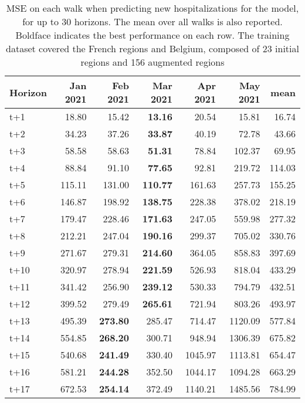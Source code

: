 \begin{table}[H]
\centering
\caption{MSE on each walk when predicting new hospitalizations for the model, for up to 30 horizons. The mean over all walks is also reported. Boldface indicates the best performance on each row. The training dataset covered the French regions and Belgium, composed of 23 initial regions and 156 augmented regions }
\label{tab:MSE_walk_dense_model}
\begin{tabular}{lrrrrrr}
\toprule
Horizon &  Jan 2021 &  Feb 2021 &  Mar 2021 &  Apr 2021 &  May 2021 &    mean \\
\midrule
t+1  & 18.80  & 15.42  & \textbf{13.16}  & 20.54  & 15.81  & 16.74  \\
t+2  & 34.23  & 37.26  & \textbf{33.87}  & 40.19  & 72.78  & 43.66  \\
t+3  & 58.58  & 58.63  & \textbf{51.31}  & 78.84  & 102.37  & 69.95  \\
t+4  & 88.84  & 91.10  & \textbf{77.65}  & 92.81  & 219.72  & 114.03  \\
t+5  & 115.11  & 131.00  & \textbf{110.77}  & 161.63  & 257.73  & 155.25  \\
t+6  & 146.87  & 198.92  & \textbf{138.75}  & 228.38  & 378.02  & 218.19  \\
t+7  & 179.47  & 228.46  & \textbf{171.63}  & 247.05  & 559.98  & 277.32  \\
t+8  & 212.21  & 247.04  & \textbf{190.16}  & 299.37  & 705.02  & 330.76  \\
t+9  & 271.67  & 279.31  & \textbf{214.60}  & 364.05  & 858.83  & 397.69  \\
t+10  & 320.97  & 278.94  & \textbf{221.59}  & 526.93  & 818.04  & 433.29  \\
t+11  & 341.42  & 256.90  & \textbf{239.12}  & 530.33  & 794.79  & 432.51  \\
t+12  & 399.52  & 279.49  & \textbf{265.61}  & 721.94  & 803.26  & 493.97  \\
t+13  & 495.39  & \textbf{273.80}  & 285.47  & 714.47  & 1120.09  & 577.84  \\
t+14  & 554.85  & \textbf{268.20}  & 300.71  & 948.94  & 1306.39  & 675.82  \\
t+15  & 540.68  & \textbf{241.49}  & 330.40  & 1045.97  & 1113.81  & 654.47  \\
t+16  & 581.21  & \textbf{244.28}  & 352.50  & 1044.17  & 1094.28  & 663.29  \\
t+17  & 672.53  & \textbf{254.14}  & 372.49  & 1140.21  & 1485.56  & 784.99  \\

\end{tabular}
\end{table}
